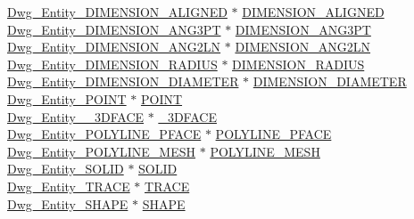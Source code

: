 \begin{DoxyCompactItemize}
\begin{tabbing}
\>\hyperlink{dwg_8h_a076dc387f1fecef536e0764e49a9315b}{Dwg\_Entity\_DIMENSION\_ALIGNED} $\ast$ \hyperlink{struct__dwg__object__entity_a4b08c6bc782a83c6930a21049412319b}{DIMENSION\_ALIGNED}\\
\>\hyperlink{dwg_8h_af79787886c22ad7eabd99f48b0371d44}{Dwg\_Entity\_DIMENSION\_ANG3PT} $\ast$ \hyperlink{struct__dwg__object__entity_ab9e5bdecbfa6a9c6f41d97fcfa927f6c}{DIMENSION\_ANG3PT}\\
\>\hyperlink{dwg_8h_abec5e4ab45bc84e82c14545918ddd4ec}{Dwg\_Entity\_DIMENSION\_ANG2LN} $\ast$ \hyperlink{struct__dwg__object__entity_adc7aea9b1970dc71db9319c92427f155}{DIMENSION\_ANG2LN}\\
\>\hyperlink{dwg_8h_ab3c236606245fb6f93acdb7b7b02a50a}{Dwg\_Entity\_DIMENSION\_RADIUS} $\ast$ \hyperlink{struct__dwg__object__entity_a0a7c21a8e6763bf7df260073f96b33cf}{DIMENSION\_RADIUS}\\
\>\hyperlink{dwg_8h_a64616859d52535c9c994b15d06a93414}{Dwg\_Entity\_DIMENSION\_DIAMETER} $\ast$ \hyperlink{struct__dwg__object__entity_a2a3c14a694bb63fe12dd51a7a4046e9b}{DIMENSION\_DIAMETER}\\
\>\hyperlink{dwg_8h_aacbc1f41686ba897f559298f62763b1a}{Dwg\_Entity\_POINT} $\ast$ \hyperlink{struct__dwg__object__entity_a28e363d3ebc7ad296e3471d2c0dcfeed}{POINT}\\
\>\hyperlink{dwg_8h_a4b3617645c4b219ac64f069c43ffa789}{Dwg\_Entity\_\_3DFACE} $\ast$ \hyperlink{struct__dwg__object__entity_a9a9a2ed719a60d064e44129dda7e850c}{\_3DFACE}\\
\>\hyperlink{dwg_8h_affec116a0fd3efa509408885cb933a44}{Dwg\_Entity\_POLYLINE\_PFACE} $\ast$ \hyperlink{struct__dwg__object__entity_a2452e81cef57893de588d5a9821afb83}{POLYLINE\_PFACE}\\
\>\hyperlink{dwg_8h_acf4a376c72f3f79f6e1ea1b00f831e93}{Dwg\_Entity\_POLYLINE\_MESH} $\ast$ \hyperlink{struct__dwg__object__entity_a9c24e78781603b5315b95694828d3b7a}{POLYLINE\_MESH}\\
\>\hyperlink{dwg_8h_aed743c3dfbc99af25687aba18401c77c}{Dwg\_Entity\_SOLID} $\ast$ \hyperlink{struct__dwg__object__entity_a67d8953bc11acaa02405105f9497c777}{SOLID}\\
\>\hyperlink{dwg_8h_ac836e090a36bce06fefe6e6b06548e18}{Dwg\_Entity\_TRACE} $\ast$ \hyperlink{struct__dwg__object__entity_a9f79ac9dc28f25391cfaec0efa329a17}{TRACE}\\
\>\hyperlink{dwg_8h_aa5997a2ce5ecda0186128da1350e04a8}{Dwg\_Entity\_SHAPE} $\ast$ \hyperlink{struct__dwg__object__entity_af5bf2a6dab4b03dc7ea9f17426bfd2d5}{SHAPE}\\

\end{tabbing}
\end{DoxyCompactItemize}

